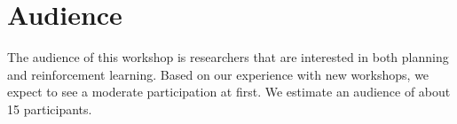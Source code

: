 \documentclass[10pt]{article}
\begin{document}
\section*{Audience}

The audience of this workshop is researchers that are interested in both
planning and reinforcement learning.
%
Based on our experience with new workshops, we expect to see a moderate
participation at first. We estimate an audience of about 15 participants.  
\end{document}

